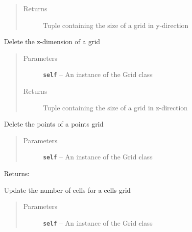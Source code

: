 \documentclass[letterpaper,10pt,english]{sphinxmanual}
\begin{document}
\begin{fulllineitems}
\begin{fulllineitems}
\begin{quote}
\begin{description}
\item[{Returns}] \leavevmode
Tuple containing the size of a grid in y-direction

\end{description}\end{quote}

\end{fulllineitems}


\begin{fulllineitems}
\label{hyvr:hyvr.hyvr.grid.Grid.del_lz}
Delete the z-dimension of a grid
\begin{quote}\begin{description}
\item[{Parameters}] \leavevmode
\textbf{\texttt{self}} -- An instance of the Grid class

\item[{Returns}] \leavevmode
Tuple containing the size of a grid in z-direction

\end{description}\end{quote}

\end{fulllineitems}


\begin{fulllineitems}
\label{hyvr:hyvr.hyvr.grid.Grid.del_points}
Delete the points of a points grid
\begin{quote}\begin{description}
\item[{Parameters}] \leavevmode
\textbf{\texttt{self}} -- An instance of the Grid class

\end{description}\end{quote}

Returns:

\end{fulllineitems}


\begin{fulllineitems}
\label{hyvr:hyvr.hyvr.grid.Grid.get_cells}
Update the number of cells for a cells grid
\begin{quote}\begin{description}
\item[{Parameters}] \leavevmode
\textbf{\texttt{self}} -- An instance of the Grid class


\end{description}
\end{quote}
\end{fulllineitems}
\end{fulllineitems}
\end{document}

